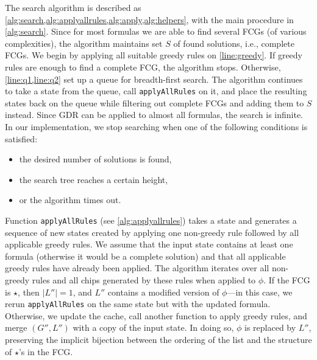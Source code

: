 The search algorithm is described as
\cref{alg:search,alg:applyallrules,alg:apply,alg:helpers}, with the main
procedure in \cref{alg:search}. Since for most formulas we are able to find
several FCGs (of various complexities), the algorithm maintains set $S$ of found
solutions, i.e., complete FCGs. We begin by applying all suitable greedy rules
on \cref{line:greedy}. If greedy rules are enough to find a complete FCG, the
algorithm stops. Otherwise, \cref{line:q1,line:q2} set up a queue for
breadth-first search. The algorithm continues to take a state from the queue,
call \texttt{applyAllRules} on it, and place the resulting states back on the
queue while filtering out complete FCGs and adding them to $S$ instead. Since
GDR can be applied to almost all formulas, the search is infinite. In our
implementation, we stop searching when one of the following conditions is
satisfied:
\begin{itemize}
  \item the desired number of solutions is found,
  \item the search tree reaches a certain height,
  \item or the algorithm times out.
\end{itemize}

Function \texttt{applyAllRules} (see \cref{alg:applyallrules}) takes a state and
generates a sequence of new states created by applying one non-greedy rule
followed by all applicable greedy rules. We assume that the input state contains
at least one formula (otherwise it would be a complete solution) and that all
applicable greedy rules have already been applied. The algorithm iterates over
all non-greedy rules and all chips generated by these rules when applied to
$\phi$. If the FCG is $\star$, then $|L''| = 1$, and $L''$ contains a modified
version of $\phi$---in this case, we rerun \texttt{applyAllRules} on the same
state but with the updated formula. Otherwise, we update the cache, call another
function to apply greedy rules, and merge $(G'', L'')$ with a copy of the input
state. In doing so, $\phi$ is replaced by $L''$, preserving the implicit
bijection between the ordering of the list and the structure of $\star$'s in the
FCG\@.

